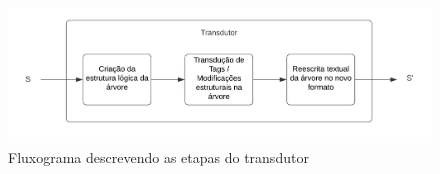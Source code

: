 \begin{figure}[!ht]
    \centering
    \includegraphics[width=\textwidth,scale=1.5]{imagens/fluxograma_transdutor.png}
    \caption[Fluxograma - transdutor]{Fluxograma descrevendo as etapas do transdutor}
    \label{fig:fluxograma_transdutor}
\end{figure}